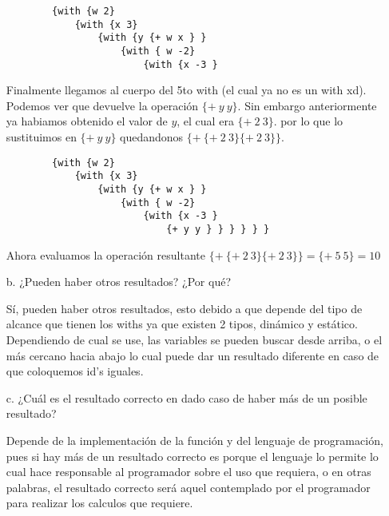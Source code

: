 \begin{enumerate}
    \begin{lstlisting}
        {with {w 2}
            {with {x 3}
                {with {y {+ w x } }
                    {with { w -2}
                        {with {x -3 }
    \end{lstlisting}

    Finalmente llegamos al cuerpo del 5to with (el cual ya no es un with xd). Podemos ver que devuelve la operación $\{+ \ y \ y\}$. Sin embargo
    anteriormente ya habiamos obtenido el valor de $y$, el cual era $\{+ \ 2 \ 3\}$. por lo que lo sustituimos en $\{+ \ y \ y\}$ quedandonos
    $\{+ \ \{+ \ 2 \ 3\} \{+ \ 2 \ 3\}\}$.

    \begin{lstlisting}
        {with {w 2}
            {with {x 3}
                {with {y {+ w x } }
                    {with { w -2}
                        {with {x -3 }
                            {+ y y } } } } } }
    \end{lstlisting}

    Ahora evaluamos la operación resultante $\{+ \ \{+ \ 2 \ 3\} \{+ \ 2 \ 3\}\} = \{+ \ 5 \ 5\} = 10$

    \item[b.] ¿Pueden haber otros resultados? ¿Por qué?
    
    Sí, pueden haber otros resultados, esto debido a que depende del tipo de alcance que tienen los withs ya que existen 2 tipos, dinámico y estático.
    Dependiendo de cual se use, las variables se pueden buscar desde arriba, o el más cercano hacia abajo lo cual puede dar un resultado diferente en caso
    de que coloquemos id's iguales.
            
    \item[c.] ¿Cuál es el resultado correcto en dado caso de haber más de un posible resultado?
    
    Depende de la implementación de la función y del lenguaje de programación, pues si hay más de un resultado correcto es porque el lenguaje lo permite
    lo cual hace responsable al programador sobre el uso que requiera, o en otras palabras, el resultado correcto será aquel contemplado por el programador
    para realizar los calculos que requiere.
            
\end{enumerate}